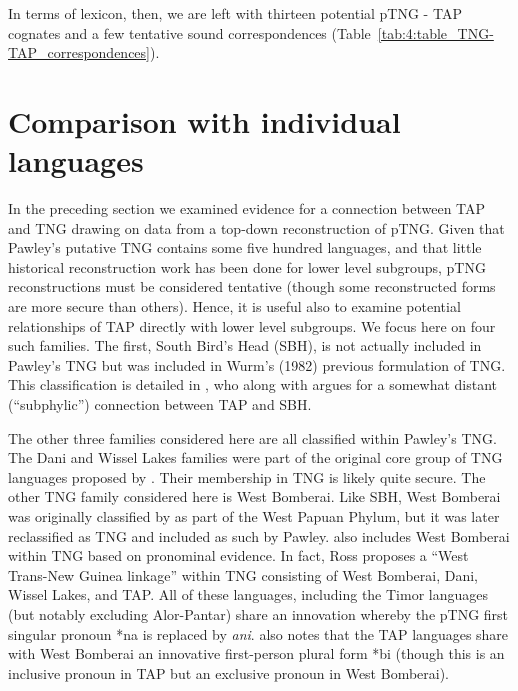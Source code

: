 In terms of lexicon, then, we are left with thirteen potential pTNG - TAP cognates and a few tentative sound correspondences (Table~\ref{tab:4:table_TNG-TAP_correspondences}).

\section{Comparison with individual languages} \label{sec:4:5}
In the preceding section we examined evidence for a connection between TAP and TNG drawing on data from a top-down reconstruction of pTNG. Given that Pawley's putative TNG contains some five hundred languages, and that little historical reconstruction work has been done for lower level subgroups, pTNG reconstructions must be considered tentative (though some reconstructed forms are more secure than others). Hence, it is useful also to examine potential relationships of TAP directly with lower level subgroups. We focus here on four such families. The first, South Bird's Head (SBH), is not actually included in Pawley's TNG but was included in Wurm's (1982) previous formulation of TNG. This classification is detailed in \citet{Voorhoeve1975}, who along with \citet{Stokhof1975} argues for a somewhat distant (``subphylic'') connection between TAP and SBH. \nocite{Wurm1982}

The other three families considered here are all classified within Pawley's TNG. The Dani and Wissel Lakes families were part of the original core group of TNG languages proposed by \citet{WurmEtAl1975}. Their membership in TNG is likely quite secure. The other TNG family considered here is West Bomberai. Like SBH, West Bomberai was originally classified by \citet{Cowan1957} as part of the West Papuan Phylum, but it was later reclassified as TNG and included as such by Pawley. \citet{Ross2005} also includes West Bomberai within TNG based on pronominal evidence. In fact, Ross proposes a ``West Trans-New Guinea linkage'' within TNG consisting of West Bomberai, Dani, Wissel Lakes, and TAP. All of these languages, including the Timor languages (but notably excluding Alor-Pantar) share an innovation whereby the pTNG first singular pronoun *na is replaced by \textit{ani}. \citet[37]{Ross2005} also notes that the TAP languages share with West Bomberai an innovative first-person plural form *bi (though this is an inclusive
pronoun in TAP but an exclusive pronoun in West Bomberai).


